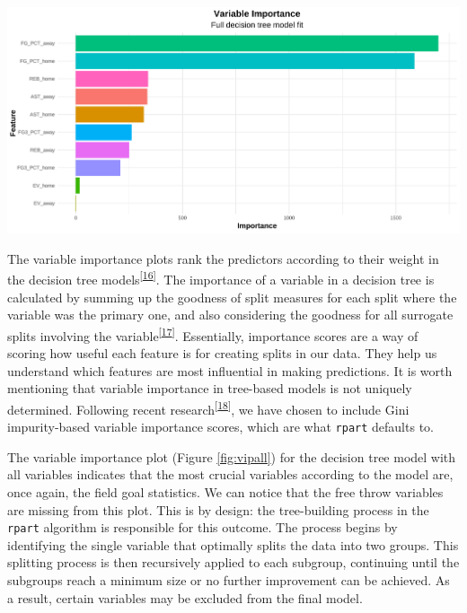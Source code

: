 \documentclass[
  12pt,
  a4paper,
]{article}
\let\origfigure\figure
\let\endorigfigure\endfigure
\renewenvironment{figure}[1][2] {
    \expandafter\origfigure\expandafter[H]
} {
    \endorigfigure
}
\begin{document}
\begin{figure}

{\centering \includegraphics[width=1\linewidth]{latex/plots/plot_8} 

}

\caption{Variable Importance plot for model with all variables included}\label{fig:vipall}
\end{figure}

The variable importance plots rank the predictors according to their weight in the decision tree models\textsuperscript{{[}\protect\hyperlink{ref-bruce2020practical}{16}{]}}. The importance of a variable in a decision tree is calculated by summing up the goodness of split measures for each split where the variable was the primary one, and also considering the goodness for all surrogate splits involving the variable\textsuperscript{{[}\protect\hyperlink{ref-rpart-vignette}{17}{]}}. Essentially, importance scores are a way of scoring how useful each feature is for creating splits in our data. They help us understand which features are most influential in making predictions. It is worth mentioning that variable importance in tree-based models is not uniquely determined. Following recent research\textsuperscript{{[}\protect\hyperlink{ref-permvip}{18}{]}}, we have chosen to include Gini impurity-based variable importance scores, which are what \texttt{rpart} defaults to.

The variable importance plot (Figure \ref{fig:vipall}) for the decision tree model with all variables indicates that the most crucial variables according to the model are, once again, the field goal statistics. We can notice that the free throw variables are missing from this plot. This is by design: the tree-building process in the \texttt{rpart} algorithm is responsible for this outcome. The process begins by identifying the single variable that optimally splits the data into two groups. This splitting process is then recursively applied to each subgroup, continuing until the subgroups reach a minimum size or no further improvement can be achieved. As a result, certain variables may be excluded from the final model.
\end{document}
